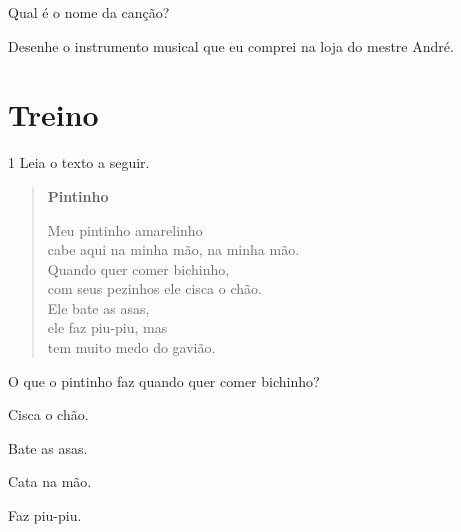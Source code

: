 
\begin{escolha}
\item Qual é o nome da canção?


\item Desenhe o instrumento musical que eu comprei na loja do mestre André.

\begin{mdframed}[linewidth=2pt,linecolor=salmao,roundcorner=10pt]
\vspace{3cm}
\end{mdframed}
\end{escolha}

\section*{Treino}

\num{1} Leia o texto a seguir.

\begin{myquote}
\begin{verse}
\textbf{Pintinho}

Meu pintinho amarelinho\\
cabe aqui na minha mão, na minha mão.\\
Quando quer comer bichinho,\\ 
com seus pezinhos ele cisca o chão.\\
Ele bate as asas,\\
ele faz piu-piu, mas\\ 
tem muito medo do gavião.
\end{verse}

\end{myquote}

O que o pintinho faz quando quer comer bichinho?

\begin{escolha}
	\item Cisca o chão.

	\item Bate as asas.

	\item Cata na mão.

	\item Faz piu-piu.
\end{escolha}

